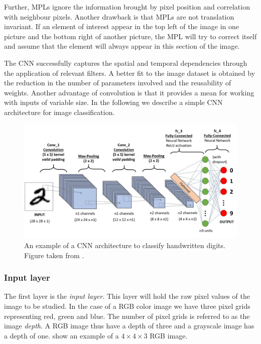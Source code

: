 \documentclass[../main.tex]{subfiles}
\begin{document}
Further, MPLs ignore the information brought by pixel position and correlation with neighbour pixels. Another drawback is that MPLs are not translation invariant. If an element of interest appear in the top left of the image in one picture and the bottom right of another picture, the MPL will try to correct itself and assume that the element will always appear in this section of the image. 

The CNN successfully captures the spatial and temporal dependencies through the application of relevant filters. A better fit to the image dataset is obtained by the reduction in the number of parameters involved and the reusability of weights. Another advantage of convolution is that it provides a mean for working with inputs of variable size. In the following we describe a simple CNN architecture for image classification. 

\begin{figure}[!htb]
    \centering
    \includegraphics[width=\textwidth]{fig/ex-cnn.jpeg}
    \caption{An example of a CNN architecture to classify handwritten digits. Figure taken from \cite{sumit2018}.}
    \label{fig:example-cnn}
\end{figure}

\subsubsection{Input layer}
The first layer is the \textit{input layer}. This layer will hold the raw pixel values of the image to be studied. In the case of a RGB color image we have three pixel grids representing red, green and blue. The number of pixel grids is referred to as the image \textit{depth}. A RGB image thus have a depth of three and a grayscale image has a depth of one.  show an example of a \ensuremath{4\times4\times3} RGB image. 
\end{document}
